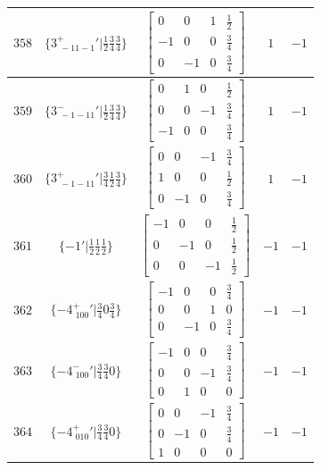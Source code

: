 \documentclass[fleqn,8pt]{jsarticle}
\begin{document}
\begin{longtable}{ccccc}
$ 358 $ & $ \{3^{+}_{\,\,-11-1}{}'|\frac{1}{2} \frac{3}{4} \frac{3}{4}\} $ & $ \begin{bmatrix} 0 & 0 & 1 & \frac{1}{2} \\ -1 & 0 & 0 & \frac{3}{4} \\ 0 & -1 & 0 & \frac{3}{4} \end{bmatrix} $ & $ 1 $ & $ -1 $ \\ \hline
$ 359 $ & $ \{3^{-}_{\,\,-1-11}{}'|\frac{1}{2} \frac{3}{4} \frac{3}{4}\} $ & $ \begin{bmatrix} 0 & 1 & 0 & \frac{1}{2} \\ 0 & 0 & -1 & \frac{3}{4} \\ -1 & 0 & 0 & \frac{3}{4} \end{bmatrix} $ & $ 1 $ & $ -1 $ \\ \hline
$ 360 $ & $ \{3^{+}_{\,\,-1-11}{}'|\frac{3}{4} \frac{1}{2} \frac{3}{4}\} $ & $ \begin{bmatrix} 0 & 0 & -1 & \frac{3}{4} \\ 1 & 0 & 0 & \frac{1}{2} \\ 0 & -1 & 0 & \frac{3}{4} \end{bmatrix} $ & $ 1 $ & $ -1 $ \\ \hline
$ 361 $ & $ \{-1{}'|\frac{1}{2} \frac{1}{2} \frac{1}{2}\} $ & $ \begin{bmatrix} -1 & 0 & 0 & \frac{1}{2} \\ 0 & -1 & 0 & \frac{1}{2} \\ 0 & 0 & -1 & \frac{1}{2} \end{bmatrix} $ & $ -1 $ & $ -1 $ \\ \hline
$ 362 $ & $ \{-4^{+}_{\,\,100}{}'|\frac{3}{4} 0 \frac{3}{4}\} $ & $ \begin{bmatrix} -1 & 0 & 0 & \frac{3}{4} \\ 0 & 0 & 1 & 0 \\ 0 & -1 & 0 & \frac{3}{4} \end{bmatrix} $ & $ -1 $ & $ -1 $ \\ \hline
$ 363 $ & $ \{-4^{-}_{\,\,100}{}'|\frac{3}{4} \frac{3}{4} 0\} $ & $ \begin{bmatrix} -1 & 0 & 0 & \frac{3}{4} \\ 0 & 0 & -1 & \frac{3}{4} \\ 0 & 1 & 0 & 0 \end{bmatrix} $ & $ -1 $ & $ -1 $ \\ \hline
$ 364 $ & $ \{-4^{+}_{\,\,010}{}'|\frac{3}{4} \frac{3}{4} 0\} $ & $ \begin{bmatrix} 0 & 0 & -1 & \frac{3}{4} \\ 0 & -1 & 0 & \frac{3}{4} \\ 1 & 0 & 0 & 0 \end{bmatrix} $ & $ -1 $ & $ -1 $ \\ \hline

\end{longtable}
\end{document}
